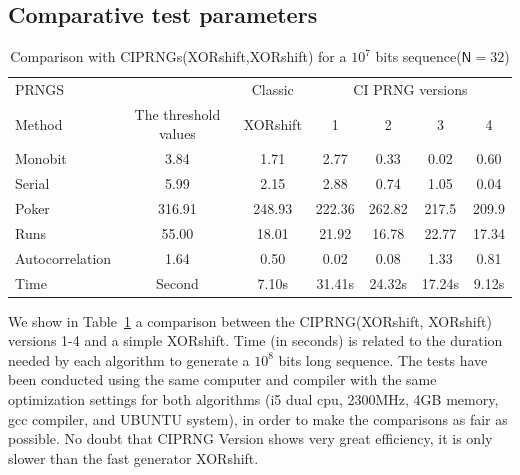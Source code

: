 \subsection{Comparative test parameters}

\begin{table}
\renewcommand{\arraystretch}{1.3}
\caption{Comparison with CIPRNGs(XORshift,XORshift) for a $10^7$ bits sequence($\mathsf{N}=32$)}
\label{Comparison22}
\centering
\begin{tabular}{lcccccc}
\toprule
PRNGS & & Classic & \multicolumn{4}{c}{CI PRNG versions}\\
Method & The threshold values& XORshift & 1& 2 &3 & 4 \\ \hline 
 
Monobit			&3.84		&1.71		&2.77		&0.33	&0.02 &0.60 \\ \hline
Serial		&5.99		&2.15		&2.88		&0.74		&1.05 &0.04 \\ \hline
Poker	&316.91	&248.93	&222.36	&262.82		 &217.5 &209.9\\ \hline
Runs 			&55.00	&18.01	&21.92	&16.78	&22.77 &17.34 \\ \hline
Autocorrelation		&1.64		&0.50		&0.02		&0.08 &1.33 &0.81		 \\\hline
Time			&Second		&7.10s		&31.41s	&24.32s & 17.24s &9.12s \\		 
\bottomrule
\end{tabular}
\end{table}



We show in Table~\ref{Comparison22} a comparison between the CIPRNG(XORshift, XORshift) versions 1-4  and a simple XORshift. Time (in seconds) is related to the duration needed by each algorithm to generate a $10^8$ bits long sequence.
The tests have been conducted using the same computer and compiler with the same optimization settings for both algorithms (i5 dual cpu, 2300MHz, 4GB memory, gcc compiler, and UBUNTU system), in order to make the
comparisons as fair as possible. No doubt that CIPRNG Version shows very great efficiency, it is only slower than the fast generator XORshift.


